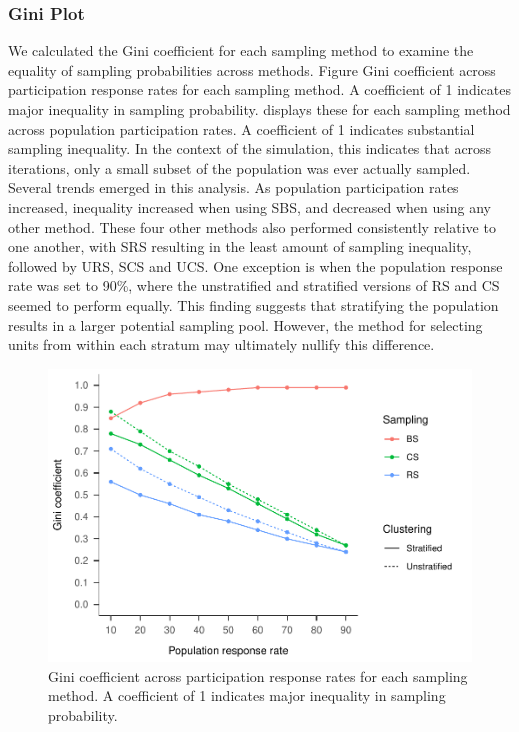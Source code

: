 \documentclass[man,floatsintext]{apa6}
\begin{document}
\hypertarget{gini-plot}{%
\subsubsection{Gini Plot}\label{gini-plot}}

We calculated the Gini coefficient for each sampling method to examine the equality of sampling probabilities across methods. Figure Gini coefficient across participation response rates for each sampling method. A coefficient of 1 indicates major inequality in sampling probability. displays these for each sampling method across population participation rates. A coefficient of 1 indicates substantial sampling inequality. In the context of the simulation, this indicates that across iterations, only a small subset of the population was ever actually sampled. Several trends emerged in this analysis. As population participation rates increased, inequality increased when using SBS, and decreased when using any other method. These four other methods also performed consistently relative to one another, with SRS resulting in the least amount of sampling inequality, followed by URS, SCS and UCS. One exception is when the population response rate was set to 90\%, where the unstratified and stratified versions of RS and CS seemed to perform equally. This finding suggests that stratifying the population results in a larger potential sampling pool. However, the method for selecting units from within each stratum may ultimately nullify this difference.



\begin{figure}
\centering
\includegraphics{GenSamp_Paper_files/figure-latex/fig-gini-1.pdf}
\caption{\label{fig:fig-gini}Gini coefficient across participation response rates for each sampling method. A coefficient of 1 indicates major inequality in sampling probability.}
\end{figure}
\end{document}

